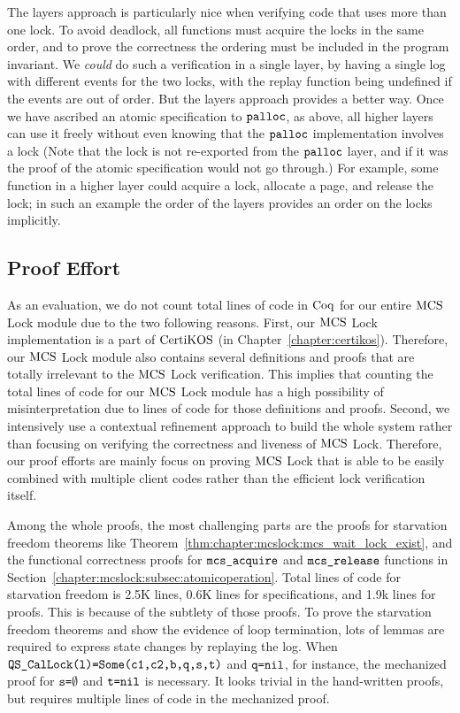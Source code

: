 The layers approach is particularly nice when verifying code that uses more than one
lock. To avoid deadlock, all functions must acquire the locks in the
same order, and to prove the correctness the ordering must be
included in the program invariant. We \emph{could} do such a
verification in a single layer, by having a single log with different
events for the two locks, with the replay function being undefined if
the events are out of order. But the layers approach provides a
better way. Once we have ascribed an atomic specification to
${\mathrm{\texttt{palloc}}}$, as above, all higher layers can use it
freely without even knowing that the ${\mathrm{\texttt{palloc}}}$ implementation
involves a lock (Note that the lock is not re-exported from the
${\mathrm{\texttt{palloc}}}$ layer, and if it was the proof of the atomic
specification would not go through.)  For example, some function in a
higher layer could acquire a lock, allocate a page, and release the
lock; in such an example the order of the layers provides an order
on the locks implicitly.

\subsection{Proof Effort}


As an evaluation, we do not count  total lines of code in $\mathrm{Coq}$ for our entire 
$\mathrm{MCS}$ Lock module due to the two following reasons. First, our $\mathrm{MCS}$ Lock implementation 
is a part of $\mathrm{CertiKOS}$ (in Chapter~\ref{chapter:certikos}). Therefore, our $\mathrm{MCS}$ Lock module also contains several definitions 
and proofs that are totally irrelevant to the $\mathrm{MCS}$ Lock verification. 
This implies that counting the total lines of code for our $\mathrm{MCS}$ Lock module has a 
high possibility of misinterpretation due to  lines of code for those definitions and proofs.
Second, we intensively use a contextual refinement approach to 
build the whole system rather than focusing on verifying the correctness and 
liveness of $\mathrm{MCS}$ Lock. Therefore, our proof efforts are mainly focus on proving 
$\mathrm{MCS}$ Lock that is able to be easily combined with multiple client codes 
rather than the efficient lock verification itself.  

Among the whole proofs, the most challenging parts are the proofs for starvation 
freedom theorems like Theorem~\ref{thm:chapter:mcslock:mcs_wait_lock_exist}, 
and the functional correctness proofs for ${\mathrm{\texttt{mcs\_acquire}}}$ 
and ${\mathrm{\texttt{mcs\_release}}}$ functions
in Section~\ref{chapter:mcslock:subsec:atomicoperation}.
Total lines of code for starvation freedom is 2.5K lines, 0.6K lines for specifications, 
and 1.9k lines for proofs. This is because of the subtlety of those proofs. 
To prove the starvation freedom theorems and show the evidence of loop termination,
lots of lemmas are required to express
state changes by replaying the log. 
When ${\mathrm{\texttt{QS\_CalLock}}}{\mathrm{\texttt{(l)=}}}{\mathrm{\texttt{Some}}}{\mathrm{\texttt{(c1,c2,b,q,s,t)}}}$
and ${\mathrm{\texttt{q=}}}{\mathrm{\texttt{nil}}}$, 
for instance, the mechanized proof for ${\mathrm{\texttt{s=}}}\emptyset$ 
and ${\mathrm{\texttt{t=}}}{\mathrm{\texttt{nil}}}$ is necessary. It looks trivial in the hand-written proofs, 
but requires multiple lines of code in the mechanized proof. 


